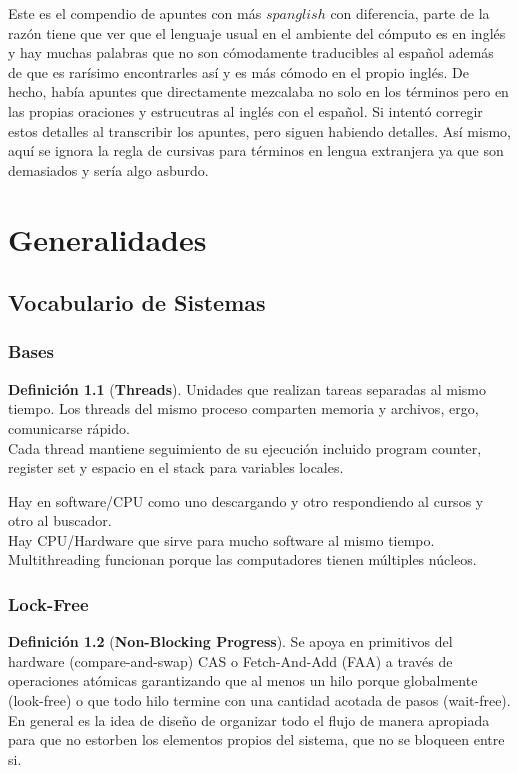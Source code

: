 \documentclass[11pt,a4paper,oneside]{report}
\theoremstyle{definition}
\newtheorem{definicion}{Definición}[chapter]
\theoremstyle{plain}
\theoremstyle{remark}
\newcommand{\termino}[1]{\textbf{#1}\index{#1}}
\begin{document}
Este es el compendio de apuntes con más $spanglish$ con diferencia, parte de la razón tiene que 
ver que el lenguaje usual en el ambiente del cómputo es en inglés y hay muchas palabras que no son 
cómodamente traducibles al español además de que es rarísimo encontrarles así y es más cómodo en el
propio inglés. De hecho, había apuntes que directamente mezcalaba no solo en los términos pero en las
propias oraciones y estrucutras al inglés con el español. Si intentó corregir estos detalles al transcribir 
los apuntes, pero siguen habiendo detalles. Así mismo, aquí se ignora la regla de cursivas para términos 
en lengua extranjera ya que son demasiados y sería algo asburdo.\\

\part{Generalidades}

\chapter{Vocabulario de Sistemas}

\section{Bases}
\begin{definicion}[\termino{Threads}]
  Unidades que realizan tareas separadas al mismo tiempo. Los threads del mismo 
  proceso comparten memoria y archivos, ergo, comunicarse rápido.\\
  Cada thread mantiene seguimiento de su ejecución incluido program counter, register set y 
  espacio en el stack para variables locales.
\end{definicion}
Hay en software/CPU como uno descargando y otro respondiendo al cursos y otro al buscador.\\
Hay CPU/Hardware que sirve para mucho software al mismo tiempo. \\
Multithreading funcionan porque las computadores tienen múltiples núcleos.

\section{Lock-Free}

\begin{definicion}[\termino{Non-Blocking Progress}]
  Se apoya en primitivos del hardware (compare-and-swap) CAS o 
  Fetch-And-Add (FAA) a través de operaciones atómicas garantizando que al menos 
  un hilo porque globalmente (look-free) o que todo hilo termine con una cantidad acotada de 
  pasos (wait-free).\\
  En general es la idea de diseño de organizar todo el flujo de manera apropiada para que no estorben los 
  elementos propios del sistema, que no se bloqueen entre si.
\end{definicion}
\end{document}
